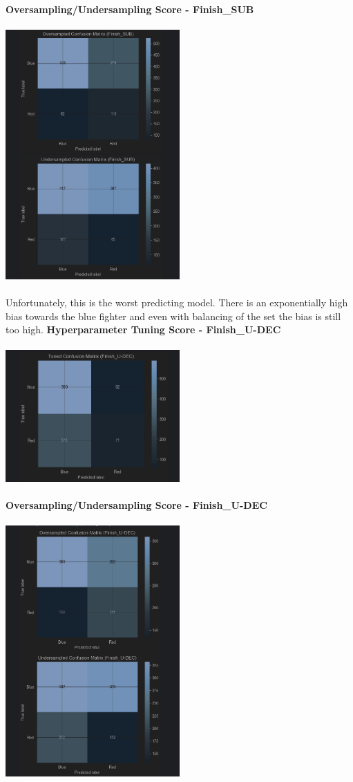 \documentclass{article}
\begin{document}
	{\large \textbf{Oversampling/Undersampling Score - Finish\_SUB}}\\\\
	\includegraphics[width=0.5\textwidth]{images/CM_U_O_SUB.png}\\\\
	Unfortunately, this is the worst predicting model. There is an exponentially high bias towards the blue fighter and even with balancing of the set the bias is still too high.
	\newpage
	{\large \textbf{Hyperparameter Tuning Score - Finish\_U-DEC}}\\\\
	\includegraphics[width=0.5\textwidth]{images/CM_Hyp_U-DEC.png}\\\\
	{\large \textbf{Oversampling/Undersampling Score - Finish\_U-DEC}}\\\\
	\includegraphics[width=0.5\textwidth]{images/CM_U_O_U-DEC.png}\\\\
\end{document}
